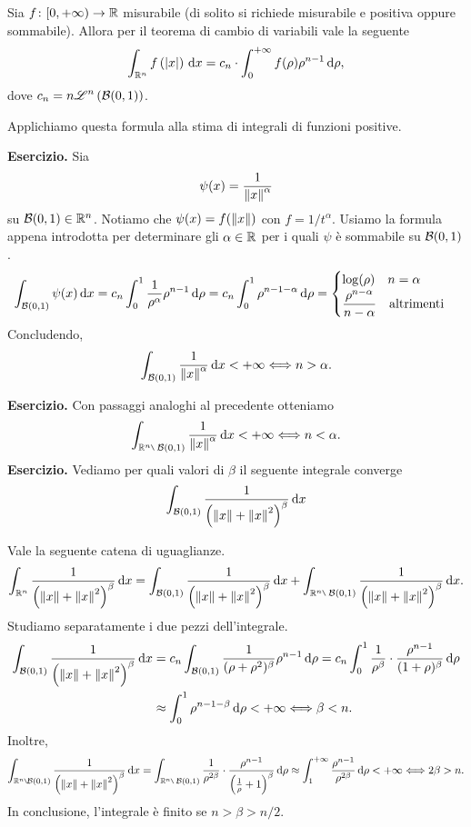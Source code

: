 
Sia $f \colon [0,+\infty) \to \mathbb R$ misurabile (di solito si richiede misurabile e positiva oppure sommabile). Allora per il teorema di cambio di variabili vale la seguente
$$
	\int_{\mathbb R^n} f\left( \left| x \right| \right) \,\mathrm{d} x = c_n \cdot \int_{0}^{+\infty} f(\rho) \rho^{n-1} \,\mathrm{d} \rho,
$$
dove $\displaystyle c_n = n \mathscr L^n \left( \mathcal{B}(0,1) \right)$.

Applichiamo questa formula alla stima di integrali di funzioni positive.

\textbf{Esercizio.}
Sia
$$
	\psi (x) = \frac{1}{\left\lVert  x  \right\rVert^{\alpha}}
$$
su $\mathcal{B}(0,1) \in \mathbb R^n$. Notiamo che $\psi(x) = f(\left\lVert  x  \right\rVert)$ con $f = 1 / t^\alpha$.
Usiamo la formula appena introdotta per determinare gli $\alpha \in \mathbb R$ per i quali $\psi$ è sommabile su $\mathcal{B}(0,1)$.
$$
\int_{\mathcal{B}(0,1)}^{} \psi(x) \,\mathrm{d} x 
= c_n \int_0^1 \frac{1}{\rho^\alpha} \rho^{n -1} \,\mathrm{d} \rho 
= c_n \int_0^1 \rho^{n-1-\alpha} \,\mathrm{d} \rho =
\begin{cases}
	\log (\rho) \quad n = \alpha \\
	\dfrac{\rho^{n-\alpha}}{n - \alpha} \quad \text{altrimenti} 
\end{cases} 
$$
Concludendo,
$$
	\int_{\mathcal{B}(0,1)}^{} \frac{1}{\left\lVert  x  \right\rVert^\alpha} \,\mathrm{d} x < + \infty \Longleftrightarrow n > \alpha.
$$

\textbf{Esercizio.}
Con passaggi analoghi al precedente otteniamo
$$
	\int_{\R^n \setminus \; \mc{B}(0,1)} \frac{1}{\norm{ x }^\alpha} \dd x < + \infty \longiff n < \alpha.
$$
\textbf{Esercizio.}
Vediamo per quali valori di $\beta$ il seguente integrale converge
$$
	\int_{\mathcal{B}(0,1)}^{} \frac{1}{\left( \left\lVert  x  \right\rVert + \left\lVert  x  \right\rVert^2 \right)^\beta} \,\mathrm{d} x
$$

Vale la seguente catena di uguaglianze.
%
$$
\int_{\R^n}^{} \frac{1}{\left( \norm{ x } + \norm{ x }^2 \right)^\beta} \dd x 
= \int_{\mc{B}(0,1)}^{} \frac{1}{\left( \norm{ x } + \norm{ x }^2 \right)^\beta} \dd x 
+ \int_{\R^n \setminus \; \mc{B}(0,1)}^{} \frac{1}{\left( \norm{ x } + \norm{ x }^2 \right)^\beta} \dd x.
$$
%
Studiamo separatamente i due pezzi dell'integrale.
%
\begin{align*}
	\int_{\mathcal{B}(0,1)}^{} \frac{1}{\left( \left\lVert  x  \right\rVert + \left\lVert  x  \right\rVert^2 \right)^\beta} \,\mathrm{d} x 
	& = c_n \int_{\mathcal{B}(0,1)}^{} \frac{1}{(\rho + \rho^2)^\beta} \rho^{n-1} \,\mathrm{d} \rho
	= c_n \int_{0}^{1} \frac{1}{\rho^\beta} \cdot \frac{\rho^{n-1}}{(1 + \rho)^\beta} \,\mathrm{d} \rho \\
	& \approx \int_{0}^{1} \rho^{n-1-\beta} \,\mathrm{d} \rho < + \infty \Longleftrightarrow  \beta < n.
\end{align*}
%
Inoltre,
%
$$
	\int_{\R^n \setminus \mc{B}(0,1)}^{} \frac{1}{\left( \norm{ x } + \norm{ x }^2 \right)^\beta} \dd x 
	= \int_{\R^n \setminus \; \mc{B}(0,1)}^{} \frac{1}{\rho^{2\beta}} \cdot \frac{\rho^{n-1}}{\left( \frac{1}{\rho} + 1 \right)^\beta} \dd \rho 
	\approx \int_{1}^{+\infty} \frac{\rho^{n-1}}{\rho^{2\beta}} \dd \rho < + \infty \longiff 2\beta > n.  
$$
%
In conclusione, l'integrale è finito se $n > \beta > n / 2$.

